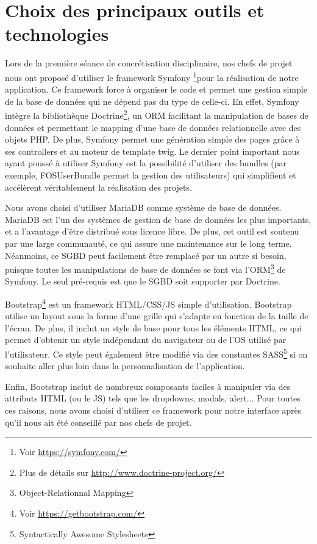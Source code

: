 \section{Choix des principaux outils et technologies}
\label{sec-principaux-outils}
\par Lors de la première séance de concrétisation disciplinaire, nos chefs de projet nous ont proposé d'utiliser le framework Symfony \footnote{Voir \url{https://symfony.com/}}pour la réalisation de notre application. Ce framework force à organiser le code et permet une gestion simple de la base de données qui ne dépend pas du type de celle-ci. En effet, Symfony intègre la bibliothèque Doctrine\footnote{Plus de détails sur \url{http://www.doctrine-project.org/}}, un ORM facilitant la manipulation de bases de données et permettant le mapping d'une base de données relationnelle avec des objets PHP. De plus, Symfony permet une génération simple des pages grâce à ses controllers et au moteur de template twig. Le dernier point important nous ayant poussé à utiliser Symfony est la possibilité d'utiliser des bundles (par exemple, FOSUserBundle permet la gestion des utilisateurs) qui simplifient et accélèrent véritablement la réalisation des projets. \\

\par Nous avons choisi d'utiliser MariaDB comme système de base de données. MariaDB est l'un des systèmes de gestion de base de données les plus importants, et a l'avantage d'être distribué sous licence libre. De plus, cet outil est soutenu par une large communauté, ce qui assure une maintenance sur le long terme. Néanmoins, ce SGBD peut facilement être remplacé par un autre si besoin, puisque toutes les manipulations de base de données se font via l'ORM\footnote{Object-Relationnal Mapping} de Symfony. Le seul pré-requis est que le SGBD soit supporter par Doctrine. \\

\par Bootstrap\footnote{Voir \url{https://getbootstrap.com/}} est un framework HTML/CSS/JS simple d'utilisation. Bootstrap utilise un layout sous la forme d'une grille qui s'adapte en fonction de la taille de l'écran. De plus, il inclut un style de base pour tous les éléments HTML, ce qui permet d'obtenir un style indépendant du navigateur ou de l'OS utilisé par l'utilisateur. Ce style peut également être modifié via des constantes SASS\footnote{Syntactically Awesome Stylesheets} si on souhaite aller plus loin dans la personnalisation de l'application.
\par Enfin, Bootstrap inclut de nombreux composants faciles à manipuler via des attributs HTML (ou le JS) tels que les dropdowns, modals, alert... Pour toutes ces raisons, nous avons choisi d'utiliser ce framework pour notre interface après qu'il nous ait été conseillé par nos chefs de projet. \\

